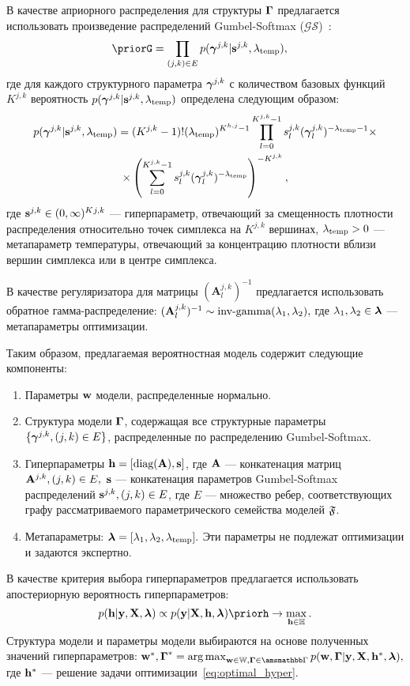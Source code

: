 \documentclass[11pt, a5paper]{dissert}
\theoremstyle{definition}
\DeclareMathOperator*{\argmax}{arg\,max}
\begin{document}
{В качестве априорного распределения для структуры $\boldsymbol{\Gamma}$ предлагается использовать произведение распределений Gumbel-Softmax ($\mathcal{GS}$)~\cite{gumbel}:
\[
    \priorG = \prod_{(j,k) \in E} p(\g^{j,k}|\s^{j,k}, \lamT), \quad 
\]
где для каждого структурного параметра $\boldsymbol{\gamma}^{j,k}$ с количеством базовых функций $K^{j,k}$ вероятность $p(\boldsymbol{\gamma}^{j,k}|\mathbf{s}^{j,k}, \lambda_{\text{temp}})$ определена следующим образом:
\begin{multline}
\label{eq:gs_pdf}
    p(\boldsymbol{\gamma}^{j,k}|\mathbf{s}^{j,k}, \lambda_{\text{temp}}) = (K^{j,k}-1)!(\lambda_{\text{temp}})^{K^{h,j}-1}\prod_{l=0}^{K^{j,k}-1} s^{j,k}_l(\boldsymbol{\gamma}^{j,k}_l)^{-\lambda_{\text{temp}} -1} \times \\ \times \left(\sum_{l=0}^{K^{j,k}-1} s^{j,k}_l(\boldsymbol{\gamma}^{j,k}_l)^{-\lambda_{\text{temp}}}\right)^{-K^{j,k}},
\end{multline}
где $\mathbf{s}^{j,k} \in (0,\infty)^K{^{j,k}}$ --- гиперпараметр, отвечающий за смещенность плотности распределения относительно точек симплекса на $K^{j,k}$ вершинах, $\lambda_{\text{temp}} > 0$ --- метапараметр температуры, отвечающий за концентрацию плотности вблизи вершин симплекса или в центре симплекса.


В качестве регуляризатора для матрицы $(\mathbf{A}^{j,k}_l)^{-1}$ предлагается использовать обратное гамма-распределение:
$
    (\mathbf{A}^{j,k}_l)^{-1} \sim \text{inv-gamma}(\lambda_1,\lambda_2),
$
где $\lambda_1,\lambda_2 \in \boldsymbol{\lambda}$ --- метапараметры оптимизации. 

Таким образом, предлагаемая вероятностная модель содержит следующие компоненты:
\begin{enumerate}
\item Параметры $\mathbf{w}$ модели, распределенные нормально.
\item Структура модели $\boldsymbol{\Gamma}$, содержащая все структурные параметры $\{\boldsymbol{\gamma}^{j,k}, (j,k) \in E\}$, распределенные по распределению Gumbel-Softmax.
\item Гиперпараметры $\mathbf{h} = [\text{diag}(\mathbf{A}), \mathbf{s}]$, где $\mathbf{A}$ --- конкатенация матриц $\mathbf{A}^{j,k}, (j,k) \in E,$ $\mathbf{s}$ --- конкатенация параметров Gumbel-Softmax распределений $\mathbf{s}^{j,k}, (j,k) \in E$, где $E$ --- множество ребер, соответствующих графу рассматриваемого параметрического семейства моделей $\mathfrak{F}$.
\item Метапараметры: $\boldsymbol{\lambda} = [\lambda_1, \lambda_2, \lambda_{\text{temp}}].$ Эти параметры не подлежат оптимизации и задаются экспертно. 
\end{enumerate}

В качестве критерия выбора гиперпараметров предлагается использовать апостериорную вероятность гиперпараметров:
\begin{equation}
\label{eq:optimal_hyper}
    \posth \propto \EV \priorh \to \max_{\h \in \Hb}.
\end{equation}
Структура модели и параметры модели выбираются на основе полученных значений гиперпараметров:
$
    \w^*,\G^* = \argmax_{\w \in \Wb, \G \in \Gb} p(\w, \G|\y, \X, \h^*, \lam ),
$
где $\mathbf{h}^*$ --- решение задачи оптимизации~\eqref{eq:optimal_hyper}.

}
\end{document}
